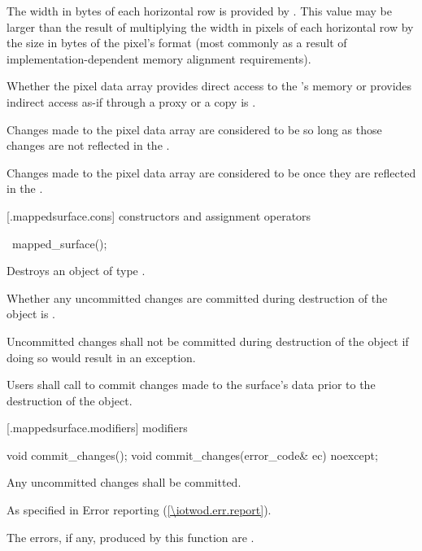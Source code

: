 \pnum
The width in bytes of each horizontal row is provided by . This value may be larger than the result of multiplying the width in pixels of each horizontal row by the size in bytes of the pixel's format (most commonly as a result of implementation-dependent memory alignment requirements).

\pnum
Whether the pixel data array provides direct access to the \underlyingsurface's memory or provides indirect access as-if through a proxy or a copy is \unspecnorm.

\pnum
Changes made to the pixel data array are considered to be  so long as those changes are not reflected in the \underlyingsurface.

\pnum
Changes made to the pixel data array are considered to be  once they are reflected in the \underlyingsurface.

 [\iotwod.mappedsurface.cons] { constructors and assignment operators}

\begin{itemdecl}
~mapped_surface();
\end{itemdecl}
\begin{itemdescr}
\pnum
\effects
Destroys an object of type . 

\pnum
\remarks
Whether any uncommitted changes are committed during destruction of the  object is \unspecnorm.

\pnum
Uncommitted changes shall not be committed during destruction of the  object if doing so would result in an exception.

\pnum
Users shall call  to commit changes made to the surface's data prior to the destruction of the  object.
\end{itemdescr}

 [\iotwod.mappedsurface.modifiers]{ modifiers}

\begin{itemdecl}
void commit_changes();
void commit_changes(error_code& ec) noexcept;
\end{itemdecl}
\begin{itemdescr}
\pnum
\effects
Any uncommitted changes shall be committed.

\pnum
\throws
As specified in Error reporting (\ref{\iotwod.err.report}).

\pnum
\errors
The errors, if any, produced by this function are .
\end{itemdescr}

